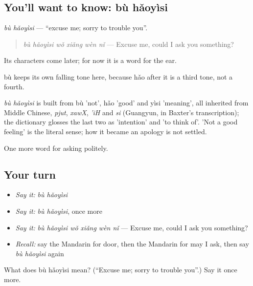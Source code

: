 \subsection*{You'll want to know: bù hǎoyìsi}
\emph{bù hǎoyìsi} — \textquotedblleft{}excuse me; sorry to trouble you\textquotedblright{}.

\begin{quote}
\emph{bù hǎoyìsi wǒ xiǎng wèn nǐ} — Excuse me, could I ask you something?
\end{quote}

Its characters come later; for now it is a word for the ear.

bù keeps its own falling tone here, because hǎo after it is a third tone, not a fourth.

\begin{cousinweb}
\emph{bù hǎoyìsi} is built from bù 'not', hǎo 'good' and yìsi 'meaning', all inherited from Middle Chinese, \emph{pjut}, \emph{xawX}, \emph{'iH} and \emph{si} (Guangyun, in Baxter's transcription); the dictionary glosses the last two as 'intention' and 'to think of'. 'Not a good feeling' is the literal sense; how it became an apology is not settled.
\end{cousinweb}

\begin{grammarlens}[title={What you've built}]
One more word for asking politely.
\end{grammarlens}

\subsection*{Your turn}
\begin{itemize}
\raggedright
  \item \emph{Say it:} \emph{bù hǎoyìsi}
  \item \emph{Say it:} \emph{bù hǎoyìsi}, once more
  \item \emph{Say it:} \emph{bù hǎoyìsi wǒ xiǎng wèn nǐ} — Excuse me, could I ask you something?
  \item \emph{Recall:} say the Mandarin for door, then the Mandarin for may I ask, then say \emph{bù hǎoyìsi} again
\end{itemize}

\begin{tcolorbox}[breakable,colback=teal!4,colframe=teal!35!black,title={Before you move on}]
What does bù hǎoyìsi mean? (\textquotedblleft{}Excuse me; sorry to trouble you\textquotedblright{}.) Say it once more.
\end{tcolorbox}
